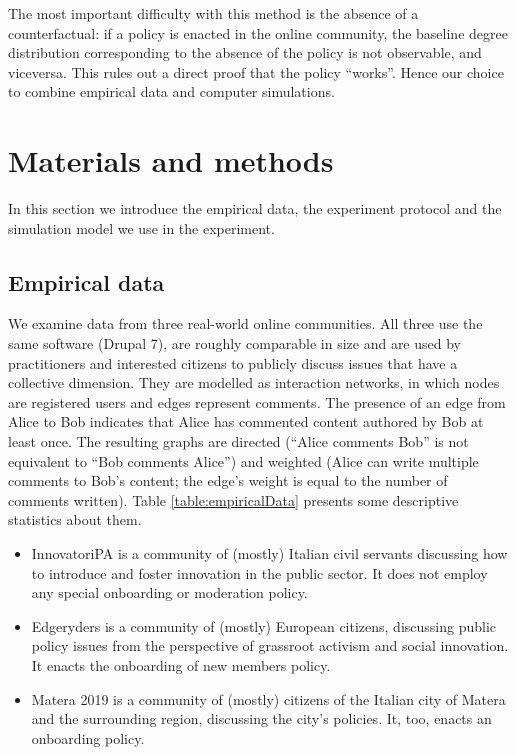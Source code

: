 \documentclass{article}
\begin{document}
The most important difficulty with this method is the absence of a counterfactual: if a policy is enacted in the online community, the baseline degree distribution corresponding to the absence of the policy is not observable, and viceversa. This rules out a direct proof that the policy ``works''. Hence our choice to combine empirical data and computer simulations. 


\section{Materials and methods}
\label{sec:materials}
In this section we introduce the empirical data, the experiment protocol and the simulation model we use in the experiment. 

\subsection{Empirical data}
\label{sec:empirical_data}

We examine data from three real-world online communities. All three use the same software (Drupal 7), are roughly comparable in size and are used by practitioners and interested citizens to publicly discuss issues that have a collective dimension. They are modelled as interaction networks, in which nodes are registered users and edges represent comments. The presence of an edge from Alice to Bob indicates that Alice has commented content authored by Bob at least once. The resulting graphs are directed (``Alice comments Bob'' is not equivalent to ``Bob comments Alice'') and weighted (Alice can write multiple comments to Bob's content; the edge's weight is equal to the number of comments written). Table \ref{table:empiricalData} presents some descriptive statistics about them. 

\begin{itemize}
\item InnovatoriPA is a community of (mostly) Italian civil servants discussing how to introduce and foster innovation in the public sector. It does not employ any special onboarding or moderation policy. 
\item Edgeryders is a community of (mostly) European citizens, discussing public policy issues from the perspective of grassroot activism and social innovation. It enacts the onboarding of new members policy. 
\item Matera 2019 is a community of (mostly) citizens of the Italian city of Matera and the surrounding region, discussing the city's policies.
It, too, enacts an onboarding policy.
\end{itemize}
\end{document}
